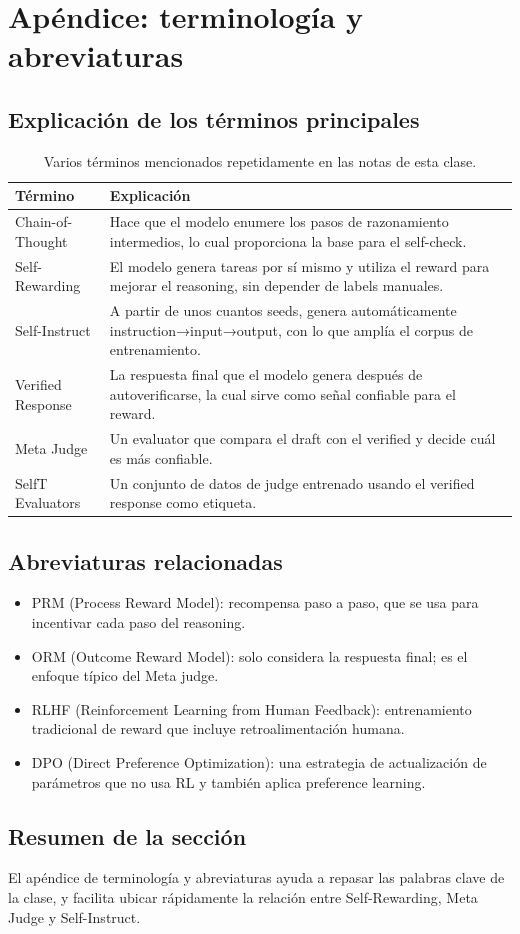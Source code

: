 \section{Apéndice: terminología y abreviaturas}
\subsection{Explicación de los términos principales}
\begin{table}[H]
\centering
\begin{tabular}{p{4cm}p{11cm}}
\toprule
Término & Explicación \\
\midrule
Chain-of-Thought & Hace que el modelo enumere los pasos de razonamiento intermedios, lo cual proporciona la base para el self-check. \\
Self-Rewarding & El modelo genera tareas por sí mismo y utiliza el reward para mejorar el reasoning, sin depender de labels manuales. \\
Self-Instruct & A partir de unos cuantos seeds, genera automáticamente instruction→input→output, con lo que amplía el corpus de entrenamiento. \\
Verified Response & La respuesta final que el modelo genera después de autoverificarse, la cual sirve como señal confiable para el reward. \\
Meta Judge & Un evaluator que compara el draft con el verified y decide cuál es más confiable. \\
SelfT Evaluators & Un conjunto de datos de judge entrenado usando el verified response como etiqueta. \\
\bottomrule
\end{tabular}
\caption{Varios términos mencionados repetidamente en las notas de esta clase.}
\end{table}

\subsection{Abreviaturas relacionadas}
\begin{itemize}
    \item PRM (Process Reward Model): recompensa paso a paso, que se usa para incentivar cada paso del reasoning.
    \item ORM (Outcome Reward Model): solo considera la respuesta final; es el enfoque típico del Meta judge.
    \item RLHF (Reinforcement Learning from Human Feedback): entrenamiento tradicional de reward que incluye retroalimentación humana.
    \item DPO (Direct Preference Optimization): una estrategia de actualización de parámetros que no usa RL y también aplica preference learning.
\end{itemize}

\subsection{Resumen de la sección}
El apéndice de terminología y abreviaturas ayuda a repasar las palabras clave de la clase, y facilita ubicar rápidamente la relación entre Self-Rewarding, Meta Judge y Self-Instruct.

